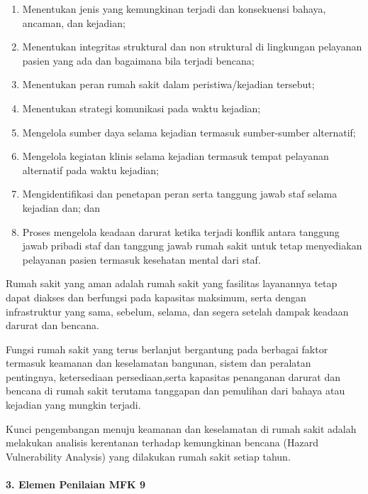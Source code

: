 \documentclass[
]{book}
\providecommand{\tightlist}{%
  \setlength{\itemsep}{0pt}\setlength{\parskip}{0pt}}
\begin{document}
\begin{enumerate}
\def\labelenumi{\alph{enumi}.}
\tightlist
\item
  Menentukan jenis yang kemungkinan terjadi dan konsekuensi bahaya, ancaman, dan kejadian;
\item
  Menentukan integritas struktural dan non struktural di lingkungan pelayanan pasien yang ada dan bagaimana bila terjadi bencana;
\item
  Menentukan peran rumah sakit dalam peristiwa/kejadian tersebut;
\item
  Menentukan strategi komunikasi pada waktu kejadian;
\item
  Mengelola sumber daya selama kejadian termasuk sumber-sumber alternatif;
\item
  Mengelola kegiatan klinis selama kejadian termasuk tempat pelayanan alternatif pada waktu kejadian;
\item
  Mengidentifikasi dan penetapan peran serta tanggung jawab staf selama kejadian dan; dan
\item
  Proses mengelola keadaan darurat ketika terjadi konflik antara tanggung jawab pribadi staf dan tanggung jawab rumah sakit untuk tetap menyediakan pelayanan pasien termasuk kesehatan mental dari staf.
\end{enumerate}

Rumah sakit yang aman adalah rumah sakit yang fasilitas layanannya tetap dapat diakses dan berfungsi pada kapasitas maksimum, serta dengan infrastruktur yang sama, sebelum, selama, dan segera setelah dampak keadaan darurat dan bencana.

Fungsi rumah sakit yang terus berlanjut bergantung pada berbagai faktor termasuk keamanan dan keselamatan bangunan, sistem dan peralatan pentingnya, ketersediaan persediaan,serta kapasitas penanganan darurat dan bencana di rumah sakit terutama tanggapan dan pemulihan dari bahaya atau kejadian yang mungkin terjadi.

Kunci pengembangan menuju keamanan dan keselamatan di rumah sakit adalah melakukan analisis kerentanan terhadap kemungkinan bencana (Hazard Vulnerability Analysis) yang dilakukan rumah sakit setiap tahun.

\hypertarget{elemen-penilaian-mfk-9}{%
\paragraph*{3. Elemen Penilaian MFK 9}\label{elemen-penilaian-mfk-9}}
\end{document}
